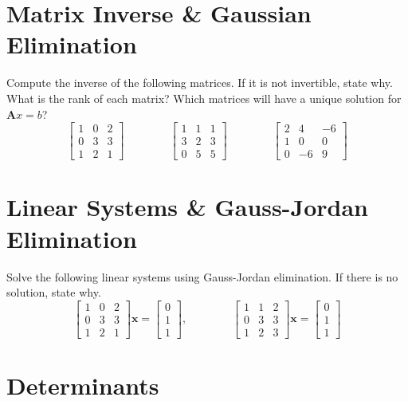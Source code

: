 \documentclass[letterpaper, 11pt]{article}
\begin{document}
\section{Matrix Inverse \& Gaussian Elimination}
Compute the inverse of the following matrices. If it is not invertible, state why. What is the rank of each matrix? Which matrices will have a unique solution for $\bm{A}x = b$?
\[  \left[ \begin{array}{ccc} 1 & 0 & 2 \\ 0 & 3 & 3 \\ 1 & 2 & 1 \end{array}   \right] \qquad \qquad 
 \left[ \begin{array}{ccc} 1 & 1 & 1 \\ 3 & 2 & 3 \\ 0 & 5 & 5 \end{array}   \right] \qquad \qquad 
  \left[ \begin{array}{ccc} 2 & 4 & -6 \\ 1 & 0 & 0 \\ 0 & -6 & 9 \end{array}   \right] \]

\section{Linear Systems \& Gauss-Jordan Elimination}
Solve the following linear systems using Gauss-Jordan elimination. If there is no solution, state why. 
\[ \left[ \begin{array}{ccc} 1 & 0 & 2 \\ 0 & 3 & 3 \\ 1 & 2 & 1 \end{array}   \right] \mathbf{x} = \left[ \begin{array}{c} 0 \\ 1 \\ 1 \end{array} \right], \qquad \qquad  
\left[ \begin{array}{ccc} 1 & 1 & 2 \\ 0 & 3 & 3 \\ 1 & 2 & 3 \end{array}   \right] \mathbf{x} = \left[ \begin{array}{c} 0 \\ 1 \\ 1 \end{array} \right]\]

\section{Determinants}
\end{document}
